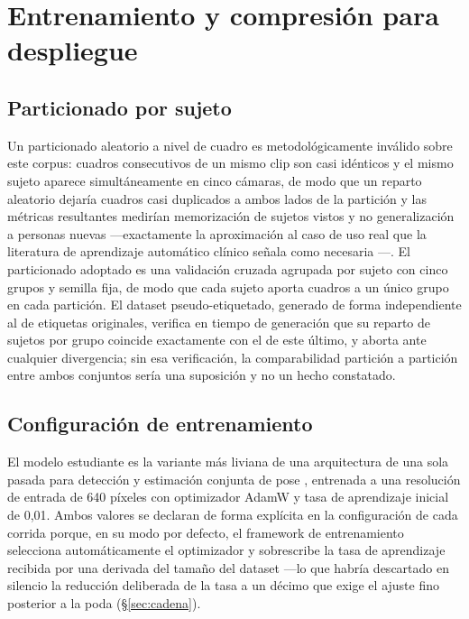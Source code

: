 \documentclass[10pt,a4paper,twocolumn]{article}
\begin{document}
\section{Entrenamiento y compresión para despliegue}
\label{sec:entrenamiento}

\subsection{Particionado por sujeto}
Un particionado aleatorio a nivel de cuadro es metodológicamente inválido
sobre este corpus: cuadros consecutivos de un mismo clip son casi idénticos y
el mismo sujeto aparece simultáneamente en cinco cámaras, de modo que un
reparto aleatorio dejaría cuadros casi duplicados a ambos lados de la
partición y las métricas resultantes medirían memorización de sujetos
vistos y no generalización a personas nuevas —exactamente la aproximación al
caso de uso real que la literatura de aprendizaje automático clínico señala
como necesaria \cite{saeb2017}—. El particionado adoptado es una validación
cruzada agrupada por sujeto con cinco grupos y semilla fija, de modo que cada
sujeto aporta cuadros a un único grupo en cada partición. El dataset
pseudo-etiquetado, generado de forma independiente al de etiquetas
originales, verifica en tiempo de generación que su reparto de sujetos por
grupo coincide exactamente con el de este último, y aborta ante cualquier
divergencia; sin esa verificación, la comparabilidad partición a partición
entre ambos conjuntos sería una suposición y no un hecho constatado.

\subsection{Configuración de entrenamiento}
El modelo estudiante es la variante más liviana de una arquitectura de una
sola pasada para detección y estimación conjunta de pose
\cite{maji2022,ultralytics2024}, entrenada a una resolución de entrada de 640
píxeles con optimizador AdamW y tasa de aprendizaje inicial de 0,01. Ambos
valores se declaran de forma explícita en la configuración de cada corrida
porque, en su modo por defecto, el framework de entrenamiento selecciona
automáticamente el optimizador y sobrescribe la tasa de aprendizaje recibida
por una derivada del tamaño del dataset —lo que habría descartado en
silencio la reducción deliberada de la tasa a un décimo que exige el ajuste
fino posterior a la poda (\S\ref{sec:cadena}).
\end{document}
